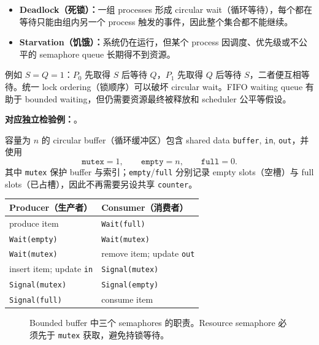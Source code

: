 \begin{itemize}
  \item \textbf{Deadlock（死锁）：}一组 processes 形成 circular wait（循环等待），每个都在等待只能由组内另一个 process 触发的事件，因此整个集合都不能继续。
  \item \textbf{Starvation（饥饿）：}系统仍在运行，但某个 process 因调度、优先级或不公平的 semaphore queue 长期得不到资源。
\end{itemize}

例如 $S=Q=1$：$P_0$ 先取得 $S$ 后等待 $Q$，$P_1$ 先取得 $Q$ 后等待 $S$，二者便互相等待。统一 lock ordering（锁顺序）可以破坏 circular wait。FIFO waiting queue 有助于 bounded waiting，但仍需要资源最终被释放和 scheduler 公平等假设。

\textbf{对应独立检验例：}。


容量为 $n$ 的 circular buffer（循环缓冲区）包含 shared data \texttt{buffer}, \texttt{in}, \texttt{out}，并使用
\[
  \texttt{mutex}=1,\qquad \texttt{empty}=n,\qquad \texttt{full}=0.
\]
其中 \texttt{mutex} 保护 buffer 与索引；\texttt{empty}/\texttt{full} 分别记录 empty slots（空槽）与 full slots（已占槽），因此不再需要另设共享 \texttt{counter}。

\begin{center}
\small
\begin{tabularx}{0.94\textwidth}{@{}XX@{}}
  \toprule
  Producer（生产者） & Consumer（消费者） \\
  \midrule
  produce item & \texttt{Wait(full)} \\
  \texttt{Wait(empty)} & \texttt{Wait(mutex)} \\
  \texttt{Wait(mutex)} & remove item; update \texttt{out} \\
  insert item; update \texttt{in} & \texttt{Signal(mutex)} \\
  \texttt{Signal(mutex)} & \texttt{Signal(empty)} \\
  \texttt{Signal(full)} & consume item \\
  \bottomrule
\end{tabularx}
\end{center}

\begin{figure}[htbp]
  \centering
  \resizebox{0.96\textwidth}{!}{}
  \caption{Bounded buffer 中三个 semaphores 的职责。Resource semaphore 必须先于 \texttt{mutex} 获取，避免持锁等待。}
  \label{fig:sc2005-l10-bounded-buffer}
\end{figure}

